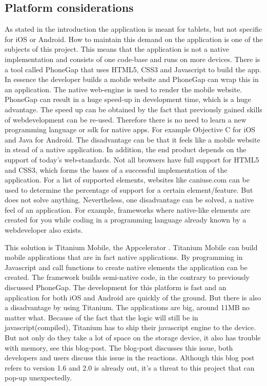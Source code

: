 \subsection{Platform considerations}
As stated in the introduction the application is meant for tablets, but not specific for iOS or Android. How to maintain this demand on the application is one of the subjects of this project. This means that the application is not a native implementation and consists of one code-base and runs on more devices. There is a tool called PhoneGap \cite{PhoneGap} that uses HTML5, CSS3 and Javascript to build the app. In essence the developer builds a mobile website and PhoneGap can wrap this in an application. The native web-engine is used to render the mobile website. PhoneGap can result in a huge speed-up in development time, which is a huge advantage.  The speed up can be obtained by the fact that previously gained skills of webdevelopment can be re-used. Therefore there is no need to learn a new programming language or sdk for native apps. For example Objective C for iOS and Java for Android. The disadvantage can be that it feels like a mobile website in stead of a native application. In addition, the end product depends on the support of today's web-standards. Not all browsers have full support for HTML5 and CSS3, which forms the bases of a successful implementation of the application. For a list of supported elements, websites like caniuse.com \cite{CSS3} can be used to determine the percentage of support for a certain element/feature. But does not solve anything. Nevertheless, one disadvantage can be solved, a native feel of an application. For example, frameworks where native-like elements are created for you while coding in a programming language already known by a webdeveloper also exists.

This solution is Titanium Mobile, the Appcelerator \cite{Titanium-Appcelerator}. Titanium Mobile can build mobile applications that are in fact native applications. By programming in Javascript and call functions to create native elements the application can be created. The framework builds semi-native code, in the contrary to previously discussed PhoneGap. The development for this platform is fast and an application for both iOS and Android are quickly of the ground. But there is also a disadvantage by using Titanium. The applications are big, around 11MB no matter what. Because of the fact that the logic will still be in javascript(compiled), Titanium has to ship their javascript engine to the device. But not only do they take a lot of space on the storage device, it also has trouble with memory, see this blog-post\cite{memoryleak}. The blog-post discusses this issue, both developers and users discuss this issue in the reactions. Although this blog post refers to version 1.6 and 2.0 is already out, it's a threat to this project that can pop-up unexpectedly.

